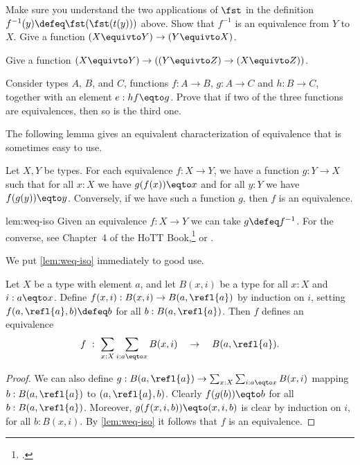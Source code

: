 \begin{xca}\label{xca:equivalence-invers}
Make sure you understand the two applications of $\fst$
in the definition $f^{-1}(y)\defeq\fst(\fst(t(y)))$ above.
Show that $f^{-1}$ is an equivalence from $Y$ to $X$.
Give a function $(X\equivto Y) \to (Y\equivto X)$.
\end{xca}

\begin{xca}\label{xca:equivalence-comp}
Give  a function $(X\equivto Y) \to ((Y\equivto Z) \to (X\equivto Z))$.
\end{xca}

\begin{xca}\label{xca:2-out-of-3}
  Consider types $A$, $B$, and $C$, functions $f:A\to B$, $g:A\to C$ and $h:B\to C$, together with an element $e: hf \eqto g$.  Prove that if two of
  the three functions are equivalences, then so is the third one.
\end{xca}

The following lemma gives an equivalent characterization
of equivalence that is sometimes easy to use.

\begin{construction}\label{lem:weq-iso}
  Let $X,Y$ be types. For each equivalence $f: X\to Y$, we have a function $g: Y\to X$ such that for all $x:X$ we have $g(f(x)) \eqto x$ and for all
  $y:Y$ we have $f(g(y)) \eqto y$. Conversely, if we have such a function $g$, then $f$ is an equivalence.
\end{construction}
\begin{implementation}{lem:weq-iso}
Given an equivalence $f: X\to Y$ we can take $g \defeq f^{-1}$.
For the converse, see Chapter~4 of the HoTT Book,\footcite{hottbook} or .
\end{implementation}

We put \cref{lem:weq-iso} immediately to good use.

\begin{lemma}\label{lem:contract-away}
Let $X$ be a type with element $a$, and let
$B(x,i)$ be a type for all $x:X$ and $i: a \eqto x$.
Define $f(x,i): B(x,i) \to B(a,\refl{a})$ by induction on $i$,
setting $f(a,\refl{a},b) \defeq b$ for all $b:B(a,\refl{a})$.
Then $f$ defines an equivalence
\[
f~:~ \sum_{x:X} \sum_{i: a \eqto x} B(x,i) \quad \to \quad B(a,\refl{a}).
\]
\end{lemma}
\begin{proof}
We can also define
$g: B(a,\refl{a})\to \sum_{x:X} \sum_{i: a \eqto x} B(x,i)$
mapping $b: B(a,\refl{a})$ to $(a,\refl{a},b)$.
Clearly $f(g(b)) \eqto b$ for all $b:B(a,\refl{a})$.
Moreover, $g(f(x,i,b)) \eqto (x,i,b)$ is clear by induction
on $i$, for all $b:B(x,i)$.
By \cref{lem:weq-iso} it follows that $f$
is an equivalence.
\end{proof}

